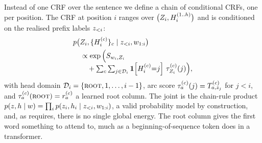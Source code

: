Instead of one CRF over the sentence we define a chain of conditional CRFs, one per position.
The CRF at position $i$ ranges over $\big(Z_{i}, H_{i}^{(1..h)}\big)$ and is conditioned on
the realised prefix labels $z_{{<}i}$:
%
\begin{equation}
\label{eq:chain}
\begin{aligned}
  &p\big(Z_{i}, \{H_{i}^{(c)}\}_c \mid z_{{<}i}, w_{1:i}\big) \\
  &\quad \propto
     \exp\Big(S_{w_i,Z_{i}} \\[-4pt]
  &\qquad
      + \textstyle\sum_{c}\sum_{j \in \mathcal{D}_{i}} \mathbf{1}\!\left[H_{i}^{(c)}{=}j\right]\, \tau^{(c)}_{Z_{i}}(j)\Big),
\end{aligned}
\end{equation}
%
with head domain $\mathcal{D}_{i} = \{\textsc{root}, 1, \dots, i-1\}$, arc score
$\tau^{(c)}_a(j) = T^{(c)}_{a, z_j}$ for $j<i$, and $\tau^{(c)}_a(\textsc{root}) = r^{(c)}_a$ a
learned root column. The joint is the chain-rule product
$p(z, h \mid w) = \prod_i p(z_i, h_i \mid z_{{<}i}, w_{1:i})$, a valid probability model by
construction, and, as  requires, there is no single global energy. The root
column gives the first word something to attend to, much as a beginning-of-sequence token does
in a transformer.

